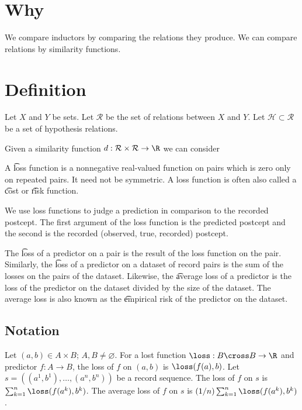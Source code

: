 

\section*{Why}

We compare inductors by comparing the relations they produce.
We can compare relations by similarity functions.

\section*{Definition}

Let $X$ and $Y$ be sets.
Let $\mathcal{R} $ be the set of relations between $X$ and $Y$.
Let $\mathcal{H}  \subset \mathcal{R} $ be a set of hypothesis relations.

Given a similarity function $d: \mathcal{R}  \times  \mathcal{R} \to \R $ we can consider

A \t{loss} function is a nonnegative real-valued function on pairs which is zero only on repeated pairs.
It need not be symmetric.
A loss function is often also called a \t{cost} or \t{risk} function.

We use loss functions to judge a prediction in comparison to the recorded postcept.
The first argument of the loss function is the predicted postcept and the second is the recorded (observed, true, recorded) postcept.

The \t{loss of a predictor on a pair} is the result of the loss function on the pair.
Similarly, the \t{loss of a predictor on a dataset} of record pairs is the sum of the losses on the pairs of the dataset.
Likewise, the \t{average loss} of a predictor is the loss of the predictor on the dataset divided by the size of the dataset.
The average loss is also known as the \t{empirical risk} of the predictor on the dataset.

\subsection*{Notation}

Let $(a, b) \in A \times B$; $A, B \neq \varnothing$.
For a lost function $\loss: B \cross B \to \R $ and predictor $f: A \to B$, the loss of $f$ on $(a, b)$ is $\loss(f(a),b)$.
Let $s = ((a^1, b^1), \dots , (a^n, b^n))$
be a record sequence.
The loss of $f$ on $s$ is $\sum_{k = 1}^{n} \loss(f(a^k), b^k)$.
The average loss of $f$ on $s$ is $(1/n)\sum_{k = 1}^{n} \loss(f(a^k), b^k)$.

